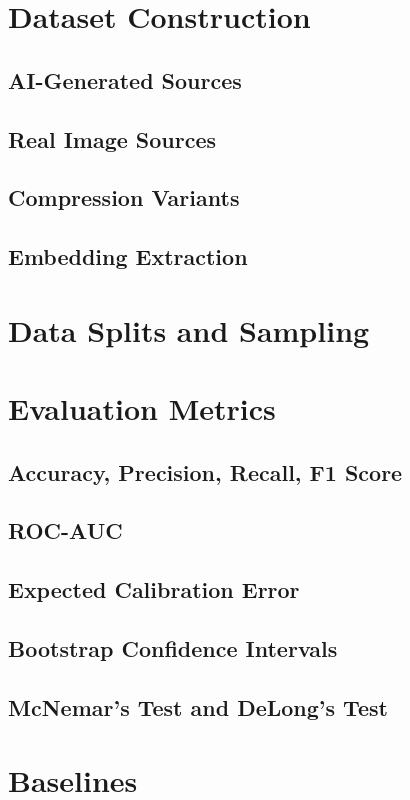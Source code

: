 \section{Dataset Construction}\label{sec:dataset}
\subsection{AI-Generated Sources}
\subsection{Real Image Sources}
\subsection{Compression Variants}
\subsection{Embedding Extraction}

\section{Data Splits and Sampling}\label{sec:splits}

\section{Evaluation Metrics}\label{sec:metrics}
\subsection{Accuracy, Precision, Recall, F1 Score}
\subsection{ROC-AUC}
\subsection{Expected Calibration Error}
\subsection{Bootstrap Confidence Intervals}
\subsection{McNemar's Test and DeLong's Test}

\section{Baselines}\label{sec:baselines}

